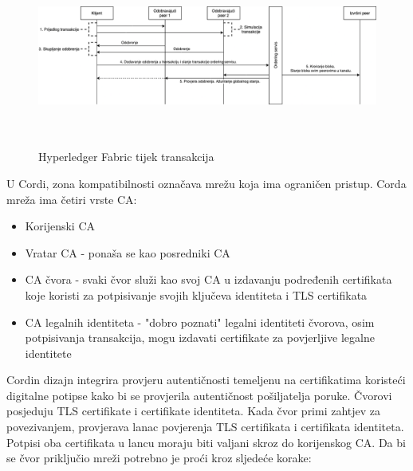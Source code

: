 \documentclass[times, utf8, diplomski]{fer}
\begin{document}
\begin{figure}[htb]
\centering
\includegraphics[width=15cm, height=6cm]{imgs/Tx Flow.png}
\caption{Hyperledger Fabric tijek transakcija}
\label{fig:fabrictxflow}
\end{figure}

U Cordi, zona kompatibilnosti označava mrežu koja ima ograničen pristup. Corda mreža ima četiri vrste CA:

\begin{itemize}

\item Korijenski CA

\item Vratar CA - ponaša se kao posredniki CA

\item CA čvora - svaki čvor služi kao svoj CA u izdavanju podređenih certifikata koje koristi za potpisivanje svojih ključeva identiteta i TLS certifikata

\item CA legalnih identiteta - "dobro poznati" legalni identiteti čvorova, osim potpisivanja transakcija, mogu izdavati certifikate za povjerljive legalne identitete

\end{itemize}

Cordin dizajn integrira provjeru autentičnosti temeljenu na certifikatima koristeći digitalne potipse kako bi se provjerila autentičnost pošiljatelja poruke. Čvorovi posjeduju TLS certifikate i certifikate identiteta. Kada čvor primi zahtjev za povezivanjem, provjerava lanac povjerenja TLS certifikata i certifikata identiteta. Potpisi oba certifikata u lancu moraju biti valjani skroz do korijenskog CA. Da bi se čvor priključio mreži potrebno je proći kroz sljedeće korake:
\end{document}
